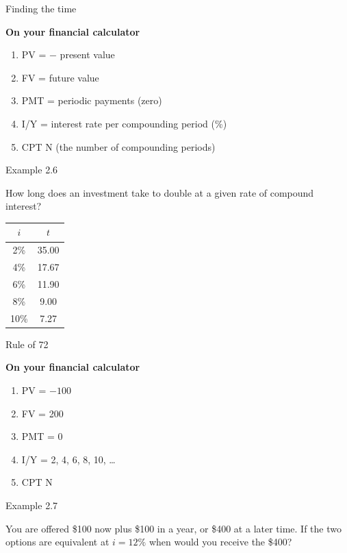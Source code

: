\documentclass{beamer}
\begin{document}
\begin{frame}{Finding the time}

\textbf{On your financial calculator}
\begin{enumerate}
\item PV = $-$ present value
\item FV = future value
\item PMT = periodic payments (zero)
\item I/Y = interest rate per compounding period (\%)
\item CPT N (the number of compounding periods)
\end{enumerate}

\end{frame}

\begin{frame}{Example 2.6}

How long does an investment take to double at a given rate of compound interest?

\vfill
\begin{flushright}
\begin{tabular}{cc}
\toprule
$i$ & $t$ \\
\midrule
2\% & 35.00 \\
4\% & 17.67 \\
6\% & 11.90 \\
8\% & 9.00 \\
10\% & 7.27 \\
\bottomrule
\end{tabular}
\end{flushright}

\end{frame}

\begin{frame}{Rule of 72}

\textbf{On your financial calculator}
\begin{enumerate}
\item PV = $-100$
\item FV = 200
\item PMT = 0
\item I/Y = 2, 4, 6, 8, 10, \ldots
\item CPT N
\end{enumerate}

\vfill
\end{frame}

\begin{frame}{Example 2.7}

You are offered \$100 now plus \$100 in a year, or \$400 at a later time. If the two options are equivalent at $i = 12\%$ when would you receive the \$400?

\vfill
\end{frame}
\end{document}
